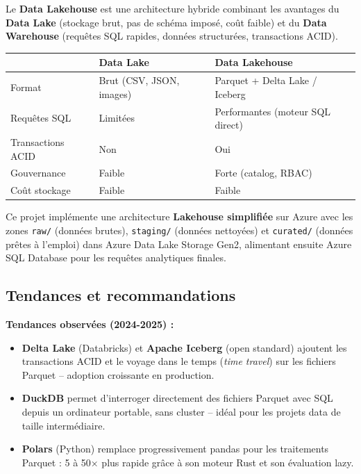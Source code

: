 \documentclass[11pt,a4paper]{article}
\begin{document}
Le \textbf{Data Lakehouse} est une architecture hybride combinant les avantages du \textbf{Data Lake}
(stockage brut, pas de schéma imposé, coût faible) et du \textbf{Data Warehouse} (requêtes SQL
rapides, données structurées, transactions ACID).

\begin{tabular}{L{4cm} L{4cm} L{5.5cm}}
  \toprule
  & \textbf{Data Lake} & \textbf{Data Lakehouse} \\
  \midrule
  Format & Brut (CSV, JSON, images) & Parquet + Delta Lake / Iceberg \\
  Requêtes SQL & Limitées & Performantes (moteur SQL direct) \\
  Transactions ACID & Non & Oui \\
  Gouvernance & Faible & Forte (catalog, RBAC) \\
  Coût stockage & Faible & Faible \\
  \bottomrule
\end{tabular}

\vspace{0.3em}

Ce projet implémente une architecture \textbf{Lakehouse simplifiée} sur Azure avec les zones
\texttt{raw/} (données brutes), \texttt{staging/} (données nettoyées) et \texttt{curated/}
(données prêtes à l'emploi) dans Azure Data Lake Storage Gen2, alimentant ensuite Azure SQL Database
pour les requêtes analytiques finales.

\subsection{Tendances et recommandations}

\textbf{Tendances observées (2024-2025) :}
\begin{itemize}
  \item \textbf{Delta Lake} (Databricks) et \textbf{Apache Iceberg} (open standard) ajoutent les transactions ACID et le voyage dans le temps (\textit{time travel}) sur les fichiers Parquet -- adoption croissante en production.
  \item \textbf{DuckDB} permet d'interroger directement des fichiers Parquet avec SQL depuis un ordinateur portable, sans cluster -- idéal pour les projets data de taille intermédiaire.
  \item \textbf{Polars} (Python) remplace progressivement pandas pour les traitements Parquet : 5 à 50× plus rapide grâce à son moteur Rust et son évaluation lazy.
\end{itemize}
\end{document}
